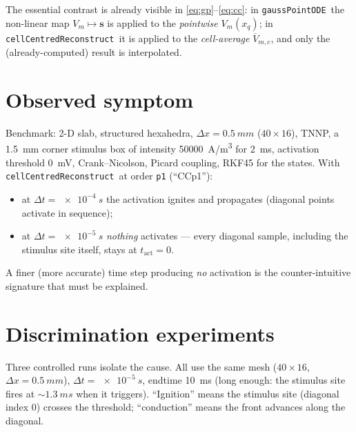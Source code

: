 \documentclass[11pt,a4paper]{article}
\newcommand{\Vm}{V_{m}}
\newcommand{\code}[1]{\texttt{\small #1}}
\newcommand{\gpode}{\code{gaussPointODE}}
\newcommand{\ccrec}{\code{cellCentredReconstruct}}
\newcommand{\states}{\mathbf{s}}
\newcommand{\Vbarc}{\overline{V}_{m,c}}
\begin{document}
The essential contrast is already visible in \eqref{eq:gp}--\eqref{eq:cc}: in
\gpode\ the non-linear map $\Vm\!\mapsto\!\states$ is applied to the
\emph{pointwise} $\Vm(x_q)$; in \ccrec\ it is applied to the \emph{cell-average}
$\Vbarc$, and only the (already-computed) result is interpolated.

\section{Observed symptom}

Benchmark: 2-D slab, structured hexahedra, $\Delta x=\SI{0.5}{mm}$
($40\times16$), TNNP, a \SI{1.5}{mm} corner stimulus box of intensity
\SI{50000}{A/m^3} for \SI{2}{ms}, activation threshold \SI{0}{mV},
Crank--Nicolson, Picard coupling, RKF45 for the states. With \ccrec\ at order
\code{p1} (``CCp1''):
\begin{itemize}[nosep]
  \item at $\Delta t=\SI{e-4}{s}$ the activation ignites and propagates
        (diagonal points activate in sequence);
  \item at $\Delta t=\SI{e-5}{s}$ \emph{nothing} activates --- every diagonal
        sample, including the stimulus site itself, stays at
        $t_{\mathrm{act}}=0$.
\end{itemize}
A finer (more accurate) time step producing \emph{no} activation is the
counter-intuitive signature that must be explained.

\section{Discrimination experiments}

Three controlled runs isolate the cause. All use the same mesh
($40\times16$, $\Delta x=\SI{0.5}{mm}$), $\Delta t=\SI{e-5}{s}$, endtime
\SI{10}{ms} (long enough: the stimulus site fires at ${\sim}\SI{1.3}{ms}$ when it
triggers). ``Ignition'' means the stimulus site (diagonal index $0$) crosses the
threshold; ``conduction'' means the front advances along the diagonal.
\end{document}
